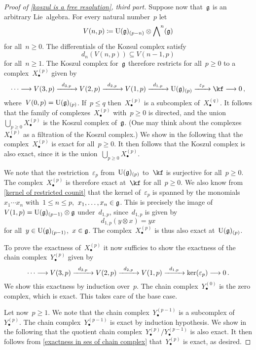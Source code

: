 \begin{proof}[Proof of \cref{koszul is a free resolution}, third part]
  Suppose now that~$\mathfrak{g}$ is an arbitrary Lie~algebra.
  For every natural number~$p$ let
  \[
    V(n,p)
    \coloneqq
    \operatorname{U}(\mathfrak{g})_{(p-n)} \otimes \operatorname{\bigwedge}^n(\mathfrak{g})
  \]
  for all~$n \geq 0$.
  The differentials of the Kozsul complex satisfy
  \[
    d_n( V(n,p) )
    \subseteq
    V(n-1,p)
  \]
  for all~$n \geq 1$.
  The Koszul complex for~$\mathfrak{g}$ therefore restricts for all~$p \geq 0$ to a complex~$X^{(p)}_\bullet$ given by
  \[
    \dotsb
    \to
    V(3,p)
    \xto{d_{3,p}}
    V(2,p)
    \xto{d_{2,p}}
    V(1,p)
    \xto{d_{1,p}}
    \Univ(\glie)_{(p)}
    \xto{\varepsilon_p}
    \kf
    \to
    0 \,,
  \]
  where~$V(0,p) = \operatorname{U}(\mathfrak{g})_{(p)}$. 
  If~$p \leq q$ then~$X^{(p)}_\bullet$ is a subcomplex of~$X^{(q)}_\bullet$.
  It follows that the family of complexes~$X^{(p)}_\bullet$ with~$p \geq 0$ is directed, and the union~$\bigcup_{p \geq 0} X^{(p)}_\bullet$ is the Koszul complex of~$\mathfrak{g}$.
  (One may think about the complexes~$X^{(p)}_\bullet$ as a filtration of the Koszul complex.)
  We show in the following that the complex~$X^{(p)}_\bullet$ is exact for all~$p \geq 0$.
  It then follows that the Koszul complex is also exact, since it is the union~$\bigcup_{p \geq 0} X^{(p)}_\bullet$.

  We note that the restriction~$\varepsilon_p$ from~$\operatorname{U}(\mathfrak{g})_{(p)}$ to~$\kf$ is surjective for all~$p \geq 0$.
  The complex~$X^{(p)}_\bullet$ is therefore exact at~$\kf$ for all~$p \geq 0$.
  We also know from \cref{kernel of restricted counit} that the kernel of~$\varepsilon_p$ is spanned by the monomials~$x_1 \dotsm x_n$ with~$1 \leq n \leq p$,~$x_1, \dotsc, x_n \in \mathfrak{g}$.
  This is precisely the image of~$V(1,p) = \operatorname{U}(\mathfrak{g})_{(p-1)} \otimes \mathfrak{g}$ under~$d_{1,p}$, since~$d_{1,p}$ is given by
  \[
    d_{1,p}( y \otimes x )
    =
    y x
  \]
  for all~$y \in \operatorname{U}(\mathfrak{g})_{(p-1)}$,~$x \in \mathfrak{g}$.
  The complex~$X^{(p)}_\bullet$ is thus also exact at~$\operatorname{U}(\mathfrak{g})_{(p)}$.

  To prove the exactness of~$X^{(p)}_\bullet$ it now sufficies to show the exactness of the chain complex~$Y^{(p)}_\bullet$ given by
  \[
    \dotsb
    \to
    V(3,p)
    \xto{d_{3,p}}
    V(2,p)
    \xto{d_{2,p}}
    V(1,p)
    \xto{d_{1,p}}
    \ker( \varepsilon_p )
    \to
    0 \,.
  \]
  We show this exactness by induction over~$p$.
  The chain complex~$Y^{(0)}_\bullet$ is the zero complex, which is exact.
  This takes care of the base case.

  Let now~$p \geq 1$.
  We note that the chain complex~$Y^{(p-1)}_\bullet$ is a subcomplex of~$Y^{(p)}_\bullet$.
  The chain complex~$Y^{(p-1)}_\bullet$ is exact by induction hypothesis.
  We show in the following that the quotient chain complex~$Y^{(p)}_\bullet / Y^{(p-1)}_\bullet$ is also exact.
  It then follows from \cref{exactness in ses of chain complex} that~$Y^{(p)}_\bullet$ is exact, as desired.


\end{proof}
